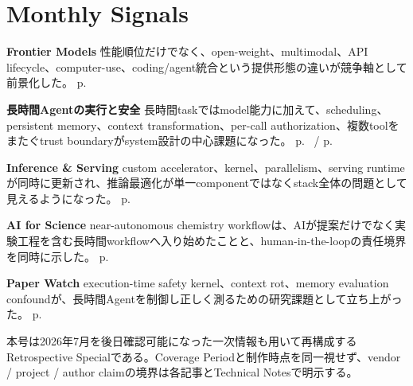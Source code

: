 \section*{Monthly Signals}
\smallskip
\noindent\textbf{Frontier Models} 性能順位だけでなく、open-weight、multimodal、API lifecycle、computer-use、coding/agent統合という提供形態の違いが競争軸として前景化した。 \hfill{\footnotesize p.~\pageref{pkg:frontier-models-june}}\par
\smallskip
\noindent\textbf{長時間Agentの実行と安全} 長時間taskではmodel能力に加えて、scheduling、persistent memory、context transformation、per-call authorization、複数toolをまたぐtrust boundaryがsystem設計の中心課題になった。 \hfill{\footnotesize p.~\pageref{pkg:agents-memory-june} / p.~\pageref{pkg:agent-safety-security-june}}\par
\smallskip
\noindent\textbf{Inference \& Serving} custom accelerator、kernel、parallelism、serving runtimeが同時に更新され、推論最適化が単一componentではなくstack全体の問題として見えるようになった。 \hfill{\footnotesize p.~\pageref{pkg:inference-serving-june}}\par
\smallskip
\noindent\textbf{AI for Science} near-autonomous chemistry workflowは、AIが提案だけでなく実験工程を含む長時間workflowへ入り始めたことと、human-in-the-loopの責任境界を同時に示した。 \hfill{\footnotesize p.~\pageref{pkg:ai-for-science-june}}\par
\smallskip
\noindent\textbf{Paper Watch} execution-time safety kernel、context rot、memory evaluation confoundが、長時間Agentを制御し正しく測るための研究課題として立ち上がった。 \hfill{\footnotesize p.~\pageref{pkg:paper-watch-june}}\par
\medskip
\begin{claimboundary}
本号は2026年7月を後日確認可能になった一次情報も用いて再構成するRetrospective Specialである。Coverage Periodと制作時点を同一視せず、vendor / project / author claimの境界は各記事とTechnical Notesで明示する。
\end{claimboundary}
\medskip
\tableofcontents
